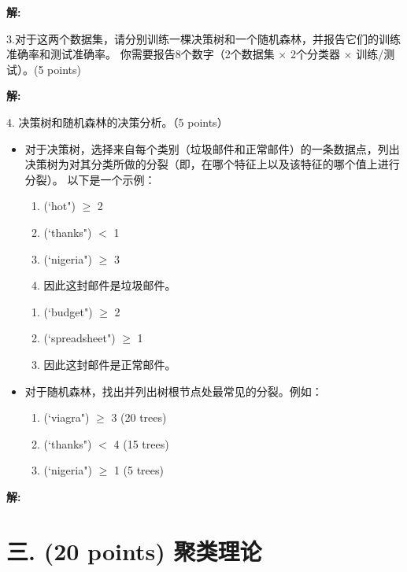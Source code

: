 \documentclass[8pt]{article}
\begin{document}
\textbf{\large 解:}

\vspace{3em}

3.对于这两个数据集，请分别训练一棵决策树和一个随机森林，并报告它们的训练准确率和测试准确率。  
你需要报告8个数字（2个数据集 $\times$ 2个分类器 $\times$ 训练/测试）。(5 points)

\textbf{\large 解:}

\vspace{3em}

4. 决策树和随机森林的决策分析。（5 points）
\begin{itemize}
\item
对于决策树，选择来自每个类别（垃圾邮件和正常邮件）的一条数据点，列出决策树为对其分类所做的分裂（即，在哪个特征上以及该特征的哪个值上进行分裂）。
以下是一个示例：

\begin{enumerate}
    \item (`hot") $\geq$ 2
    \item (`thanks") $<$ 1
    \item (`nigeria") $\geq$ 3
    \item 因此这封邮件是垃圾邮件。
\end{enumerate}

\begin{enumerate}
    \item (`budget") $\geq$ 2
    \item (`spreadsheet") $\geq$ 1
    \item 因此这封邮件是正常邮件。
\end{enumerate}

\item
对于随机森林，找出并列出树根节点处最常见的分裂。例如：

\begin{enumerate}
    \item (`viagra") $\geq$ 3 (20 trees)
    \item (`thanks") $<$ 4 (15 trees)
    \item (`nigeria") $\geq$ 1 (5 trees)
\end{enumerate}

\end{itemize}

\textbf{\large 解:}

\vspace{3em}


\section*{三. (20 points) 聚类理论}
\end{document}
